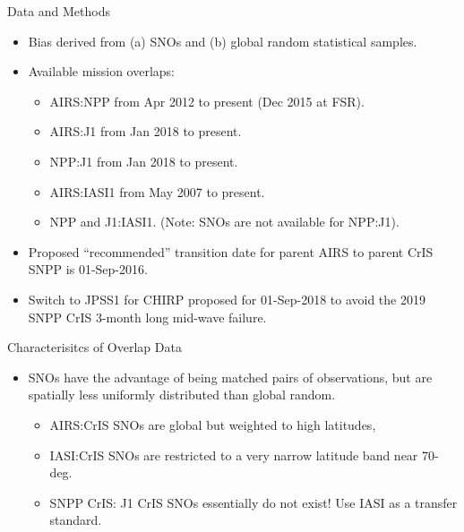 \documentclass[10pt,t]{beamer}
\begin{document}
\begin{frame}{Data and Methods}

  \begin{itemize}
    \item Bias derived from (a) SNOs and (b) global random statistical samples.
    \item Available mission overlaps:
      \begin{itemize}
      \item AIRS:NPP from Apr 2012 to present (Dec 2015 at FSR).
      \item AIRS:J1 from Jan 2018 to present.
      \item NPP:J1 from Jan 2018 to present.
      \item AIRS:IASI1 from May 2007 to present.
      \item NPP and J1:IASI1. (Note: SNOs are not available for NPP:J1).
      \end{itemize}
      
    \item Proposed ``recommended'' transition date for parent AIRS to parent CrIS SNPP is 01-Sep-2016.
    \item Switch to JPSS1 for CHIRP proposed for 01-Sep-2018 to avoid the 2019 SNPP CrIS 3-month long mid-wave failure.
  \end{itemize}
\end{frame}

\begin{frame}{Characterisitcs of Overlap Data}

  \begin{itemize}
  \item SNOs have the advantage of being matched pairs of observations, but are spatially less uniformly distributed than global random.
    \begin{itemize}
    \item AIRS:CrIS SNOs are global but weighted to high latitudes,
    \item IASI:CrIS SNOs are restricted to a very narrow latitude band near 70-deg.
    \item SNPP CrIS: J1 CrIS SNOs essentially do not exist!  Use IASI as a transfer standard.
    \end{itemize}
  \end{itemize}
\end{frame}
\end{document}
